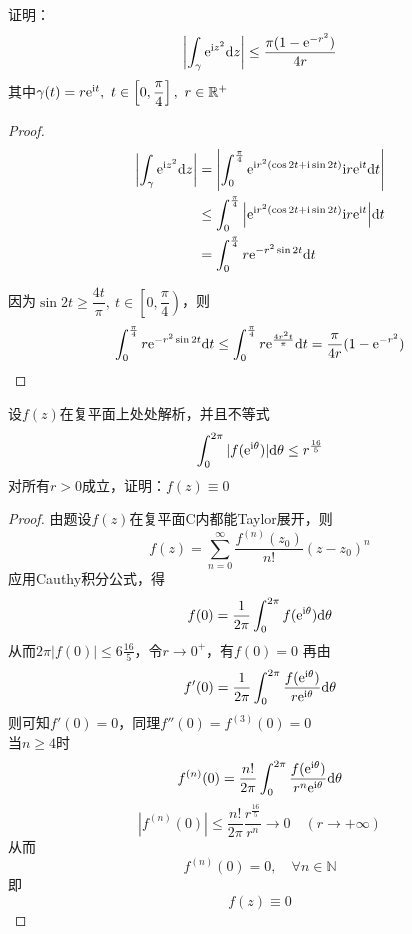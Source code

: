 \begin{proposition}

    证明：
    $$\left| \int_{\gamma}{\mathrm{e}^{\mathrm{i} z^2}}\mathrm{d} z \right| \leq \dfrac{\pi(1 - \mathrm{e}^{-r^2})}{4r}$$
    其中$\gamma(t) = r\mathrm{e}^{\mathrm{i} t},\ t\in \left[0,\dfrac{\pi}{4} \right],\ r \in \mathbb{R}^+$

\end{proposition}

\begin{proof}

    \begin{align*}
        \left| \int_{\gamma}{\mathrm{e}^{\mathrm{i} z^2}}\mathrm{d} z \right| & = \left| \int_{0}^{\frac{\pi}{4}}{\mathrm{e}^{\mathrm{i} r^2(\cos{2t} + \mathrm{i}\sin{2t})}\mathrm{i} r\mathrm{e}^{\mathrm{i} t}}\mathrm{d} t \right| \\
        & \leq \int_{0}^{\frac{\pi}{4}}{\left| \mathrm{e}^{\mathrm{i} r^2(\cos{2t} + \mathrm{i}\sin{2t})}\mathrm{i} r\mathrm{e}^{\mathrm{i} t} \right|}\mathrm{d} t \\
        & = \int_{0}^{\frac{\pi}{4}}{r\mathrm{e}^{-r^2\sin{2t}}}\mathrm{d} t
    \end{align*}

    因为$\sin{2t} \geq \dfrac{4t}{\pi}, \ t \in \left[0,\dfrac{\pi}{4} \right)$，则
    $$\int_{0}^{\frac{\pi}{4}}{r\mathrm{e}^{-r^2\sin{2t}}}\mathrm{d} t \leq \int_{0}^{\frac{\pi}{4}}{r\mathrm{e}^{\frac{4r^2t}{\pi}}}\mathrm{d} t = \dfrac{\pi}{4r}(1 - \mathrm{e}^{-r^2}) $$

\end{proof}

\begin{proposition}

    设$f(z)$在复平面上处处解析，并且不等式
    $$\int_{0}^{2\pi}{|f(\mathrm{e^{\mathrm{i} \theta}})|}\mathrm{d} \theta \leq r^{\frac{16}{5}} $$
    对所有$r > 0$成立，证明：$f(z) \equiv 0$

\end{proposition}

\begin{proof}

    由题设$f(z)$在复平面$\mathrm{C}$内都能\textup{Taylor}展开，则
    $$f(z) = \sum\limits_{n=0}^{\infty}{\dfrac{f^{(n)}(z_0)}{n!}(z - z_0)^n}$$
    应用\textup{Cauthy}积分公式，得
    $$f(0) = \dfrac{1}{2\pi} \int_{0}^{2\pi}{f(\mathrm{e}^{\mathrm{i} \theta})}\mathrm{d} \theta$$
    从而$2\pi|f(0)| \leq 6{\frac{16}{5}}$，令$r\to0^{+}$，有$f(0) = 0$
    再由
    $$f'(0) = \dfrac{1}{2\pi} \int_{0}^{2\pi}{\dfrac{f(\mathrm{e}^{\mathrm{i} \theta})}{r\mathrm{e}^{\mathrm{i} \theta}}}\mathrm{d} \theta$$
    则可知$f'(0) = 0$，同理$f''(0) = f^{(3)}(0) = 0$\\
    当$n \geq 4$时
    $$f^{(n)}(0) =  \dfrac{n!}{2\pi} \int_{0}^{2\pi}{\dfrac{f(\mathrm{e}^{\mathrm{i}\theta})}{r^n \mathrm{e}^{\mathrm{i}\theta}}}\mathrm{d} \theta$$
    $$|f^{(n)}(0)| \leq \dfrac{n!}{2\pi} \dfrac{r^{\frac{16}{5}}}{r^n} \to 0\quad(r\to+\infty)$$
    从而
    $$f^{(n)}(0) = 0,\quad \forall n \in \mathbb{N}$$
    即
    $$f(z) \equiv 0$$
    
\end{proof}

